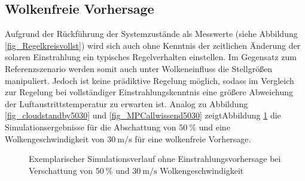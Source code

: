 \subsection{Wolkenfreie Vorhersage} \label{subsec_wolkenfreivorhergesagt}
Aufgrund der Rückführung der Systemzustände als Messwerte (siehe Abbildung \ref{fig_Regelkreisvollst}) wird sich auch ohne Kenntnis der zeitlichen Änderung der solaren Einstrahlung ein typisches Regelverhalten einstellen.
Im Gegensatz zum Referenzszenario werden somit auch unter Wolkeneinfluss die Stellgrößen manipuliert.
Jedoch ist keine prädiktive Regelung möglich, sodass im Vergleich zur Regelung bei vollständiger Einstrahlungskenntnis eine größere Abweichung der Luftaustrittstemperatur zu erwarten ist.
Analog zu Abbildung \ref{fig_cloudstandby5030} und \ref{fig_MPCallwissend5030} zeigt\linebreak Abbildung \ref{fig_unwissend5030} die Simulationsergebnisse für die Abschattung von $\SI{50}{\percent}$ und eine Wolkengeschwindigkeit von $\SI{30}{\metre\per\second}$ für eine wolkenfreie Vorhersage.

\begin{figure}[h!]
    \centering
    \setlength{\fboxsep}{1pt}
    \setlength{\fboxrule}{1pt}
\caption[Exemplarischer Simulationsverlauf ohne Einstrahlungsvorhersage bei Verschattung von $\SI{50}{\percent}$ und $\SI{30}{\metre\per\second}$ Wolkengeschwindigkeit]{Exemplarischer Simulationsverlauf ohne Einstrahlungsvorhersage bei Verschattung von $\SI{50}{\percent}$ und $\SI{30}{\metre\per\second}$ Wolkengeschwindigkeit}
    \label{fig_unwissend5030}
\end{figure}

